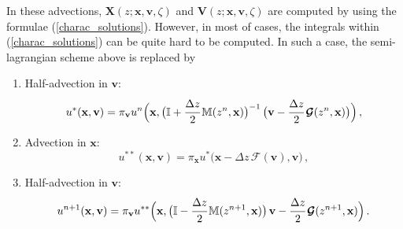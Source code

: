 \documentclass[10pt]{article}
\begin{document}
In these advections, $\mathbf{X}(z;\mathbf{x},\mathbf{v},\zeta)$ and $\mathbf{V}(z;\mathbf{x},\mathbf{v},\zeta)$ are computed by using the formulae (\ref{charac_solutions}). However, in most of cases, the integrals within (\ref{charac_solutions}) can be quite hard to be computed. In such a case, the semi-lagrangian scheme above is replaced by
\begin{enumerate}
\item Half-advection in $\mathbf{v}$:
\begin{equation}
u^{*}(\mathbf{x},\mathbf{v}) = \pi_{\mathbf{v}}u^{n}\Big(\mathbf{x}, \big(\mathbb{I} + \cfrac{\Delta z}{2}\,\mathbb{M}(z^{n},\mathbf{x})\big)^{-1} \, \big(\mathbf{v} - \cfrac{\Delta z}{2}\,\bm{\mathcal{G}}(z^{n},\mathbf{x})\big) \Big) \, ,
\end{equation}
\item Advection in $\mathbf{x}$:
\begin{equation}
u^{**}(\mathbf{x},\mathbf{v}) = \pi_{\mathbf{x}}u^{*}\big(\mathbf{x} - \Delta z \, \bm{\mathcal{F}}(\mathbf{v}),\mathbf{v}\big) \, ,
\end{equation}
\item Half-advection in $\mathbf{v}$:
\begin{equation}
u^{n+1}(\mathbf{x},\mathbf{v}) = \pi_{\mathbf{v}}u^{**}\Big(\mathbf{x}, \big(\mathbb{I} - \cfrac{\Delta z}{2}\,\mathbb{M}(z^{n+1},\mathbf{x})\big) \, \mathbf{v} - \cfrac{\Delta z}{2}\,\bm{\mathcal{G}}(z^{n+1},\mathbf{x}) \Big) \, .
\end{equation}
\end{enumerate}
\end{document}
